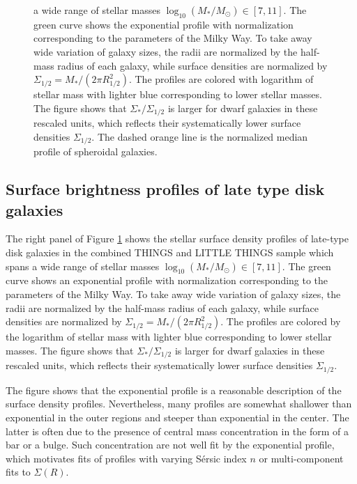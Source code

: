 \begin{figure}[ht]
{a wide range of stellar masses $\log_{10}(M_*/M_\odot)\in [7, 11]$. The green curve shows the exponential profile with normalization corresponding to the parameters of the Milky Way. To take away wide variation of galaxy sizes, the radii are normalized by the half-mass radius of each galaxy, while surface densities are normalized by $\Sigma_{1/2}=M_*/(2\pi R_{1/2}^2)$.  The profiles are colored with logarithm of stellar mass with lighter blue corresponding to lower stellar masses. The figure shows that $\Sigma_*/\Sigma_{1/2}$ is larger for dwarf galaxies in these rescaled units, which reflects their systematically lower surface densities $\Sigma_{1/2}$. The dashed orange line is the normalized median profile of spheroidal galaxies.   \label{fig:gal_spro}}
\end{figure}

\subsection{Surface brightness profiles of late type disk galaxies}

The right panel of Figure \ref{fig:gal_spro} shows the stellar surface density profiles of late-type disk galaxies in the combined THINGS and LITTLE THINGS sample which spans
a wide range of stellar masses $\log_{10}(M_*/M_\odot)\in [7, 11]$. The green curve shows an exponential profile with normalization corresponding to the parameters of the Milky Way. To take away wide variation of galaxy sizes, the radii are normalized by the half-mass radius of each galaxy, while surface densities are normalized by $\Sigma_{1/2}=M_*/(2\pi R_{1/2}^2)$.  The profiles are colored by the logarithm of stellar mass with lighter blue corresponding to lower stellar masses. The figure shows that $\Sigma_*/\Sigma_{1/2}$ is larger for dwarf galaxies in these rescaled units, which reflects their systematically lower surface densities $\Sigma_{1/2}$.

The figure shows that the exponential profile is a reasonable description of the surface density profiles. Nevertheless, many profiles are somewhat shallower than exponential in the outer regions and steeper than exponential in the center. The latter is often due to the presence of central mass concentration in the form of a bar or a bulge. Such concentration are not well fit by the exponential profile, which motivates fits of profiles with varying S\'ersic index $n$ or multi-component fits to $\Sigma(R)$. 

